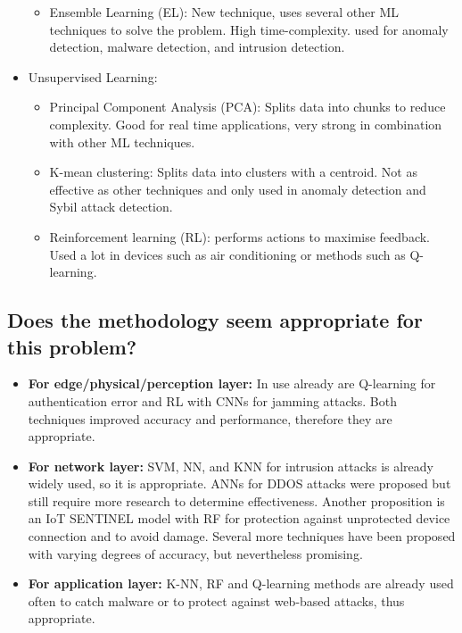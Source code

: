 \documentclass[11pt,a4paper]{article}
\begin{document}
\begin{itemize}
\begin{itemize}
            \item Ensemble Learning (EL): New technique, uses several other ML techniques to solve the problem. High time-complexity. used for anomaly detection, malware detection, and intrusion detection. 
        \end{itemize}

    \item Unsupervised Learning: 
        \begin{itemize}
            \item Principal Component Analysis (PCA): Splits data into chunks to reduce complexity. Good for real time applications, very strong in combination with other ML techniques. 
            
            \item K-mean clustering: Splits data into clusters with a centroid. Not as effective as other techniques and only used in anomaly detection and Sybil attack detection. 
            
            \item Reinforcement learning (RL): performs actions to maximise feedback. Used a lot in devices such as air conditioning or methods such as Q-learning.
        \end{itemize}
\end{itemize}

\subsection*{Does the methodology seem appropriate for this problem?}

\begin{itemize}
    \item \textbf{For edge/physical/perception layer:} In use already are Q-learning for authentication error and RL with CNNs for jamming attacks. Both techniques improved accuracy and performance, therefore they are appropriate.
    \item \textbf{For network layer:} SVM, NN, and KNN for intrusion attacks is already widely used, so it is appropriate. ANNs for DDOS attacks were proposed but still require more research to determine effectiveness. Another proposition is an IoT SENTINEL model with RF for protection against unprotected device connection and to avoid damage. Several more techniques have been proposed with varying degrees of accuracy, but nevertheless promising. 
    \item \textbf{For application layer:} K-NN, RF and Q-learning methods are already used often to catch malware or to protect against web-based attacks, thus appropriate. 
\end{itemize}
\end{document}
